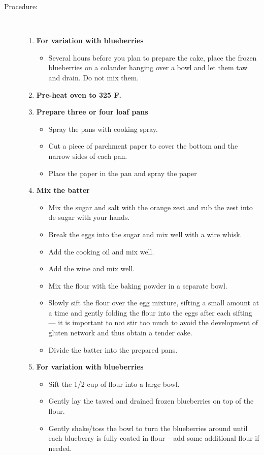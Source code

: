 \documentclass[11pt,letterpaper]{article}
\begin{document}
\begin{description}
\item[Procedure:]\ \\
	\begin{enumerate}
	\item {\bf For variation with blueberries}
	\begin{itemize}
	\item Several hours before you plan to prepare the cake, place the frozen blueberries on a colander hanging over a bowl and let them taw and drain. Do not mix them.
	\end{itemize}
	\item {\bf Pre-heat oven to 325 F.}
	\item {\bf Prepare three or four loaf pans}
	\begin{itemize}
	\item Spray the pans with cooking spray.
	\item Cut a piece of parchment paper to cover the bottom and the narrow sides of each pan.
	\item Place the paper in the pan and spray the paper
	 \end{itemize}
	\item {\bf Mix the batter}
	\begin{itemize}
	\item Mix the sugar and salt with the orange zest and rub the zest into de sugar with your hands.
	\item Break the eggs into the sugar and mix well with a wire whisk. 
	 \item Add the cooking oil and mix well.
	 \item Add the wine and mix well.
	 \item Mix the flour with the baking powder in a separate bowl.
	 \item Slowly sift the flour over the egg mixture, sifting a small amount at a time and gently folding the flour into the eggs after each sifting --- it is important to not stir too much to avoid the development of gluten network and thus obtain a tender cake.
	 \item Divide the batter into the prepared pans.
	\end{itemize}
	\item {\bf For variation with blueberries}
	\begin{itemize}
        		\item Sift the 1/2 cup of flour into a large bowl.
		\item Gently lay the tawed and drained frozen blueberries on top of the flour.
		\item Gently shake/toss the bowl to turn the blueberries around until each blueberry is fully coated in flour -- add some additional flour if needed.

\end{itemize}
\end{enumerate}
\end{description}
\end{document}
